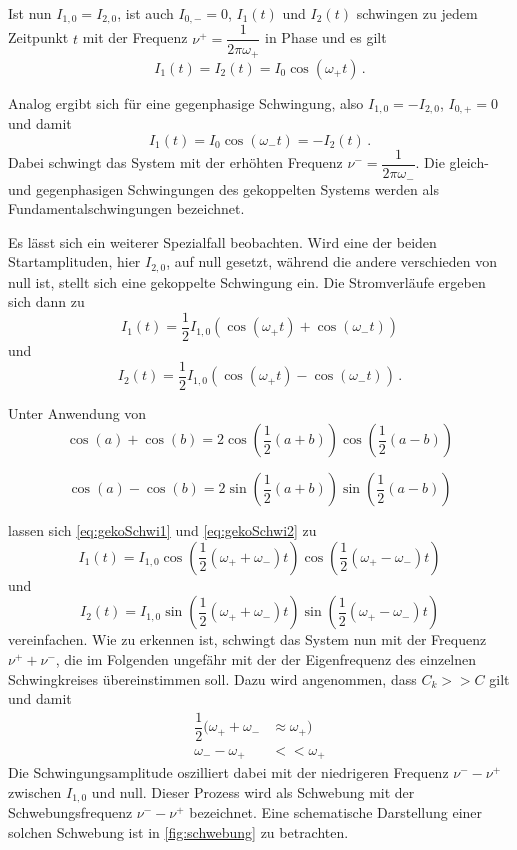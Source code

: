 Ist nun $I_{1,0} = I_{2,0}$, ist auch $I_{0,-} = 0$, $I_1(t)$ und $I_2(t)$ schwingen zu jedem Zeitpunkt $t$ mit der Frequenz $ν^+ = \dfrac{1}{2πω_+}$ in Phase und es gilt
\begin{equation*}
     I_1(t) = I_2(t) = I_0 \cos(ω_+ t)\,.
\end{equation*}

Analog ergibt sich für eine gegenphasige Schwingung, also $I_{1,0} = -I_{2,0}$, $I_{0,+}=0$ und damit
\begin{equation*}
    I_1(t) = I_0 \cos(ω_- t) = -I_2(t)\,.
\end{equation*}
Dabei schwingt das System mit der erhöhten Frequenz $ν^- = \dfrac{1}{2πω_-}$. Die gleich- und gegenphasigen Schwingungen des gekoppelten Systems werden als Fundamentalschwingungen bezeichnet.

Es lässt sich ein weiterer Spezialfall beobachten. Wird eine der beiden Startamplituden, hier $I_{2,0}$, auf null gesetzt, während die andere verschieden von null ist, stellt sich eine gekoppelte Schwingung ein.
Die Stromverläufe ergeben sich dann zu
\begin{equation}
    I_1(t) = \dfrac{1}{2} I_{1,0}(\cos(ω_+ t) + \cos(ω_- t))
    \label{eq:gekoSchwi1}
\end{equation}
und
\begin{equation}
    I_2(t) = \dfrac{1}{2} I_{1,0}(\cos(ω_+ t) - \cos(ω_- t))\,.
    \label{eq:gekoSchwi2}
\end{equation}

Unter Anwendung von
\begin{equation*}
    \cos(a) + \cos(b) = 2 \cos(\dfrac{1}{2}(a+b)) \cos(\dfrac{1}{2}(a-b))
\end{equation*} 

\begin{equation*}
    \cos(a) - \cos(b) = 2 \sin(\dfrac{1}{2}(a+b)) \sin(\dfrac{1}{2}(a-b))
\end{equation*} 

lassen sich \eqref{eq:gekoSchwi1} und \eqref{eq:gekoSchwi2} zu
\begin{equation*}
    I_1(t) = I_{1,0}\cos(\dfrac{1}{2}(ω_+ + ω_-)t) \cos(\dfrac{1}{2}(ω_+ - ω_-)t) 
\end{equation*}
und
\begin{equation*}
    I_2(t) = I_{1,0}\sin(\dfrac{1}{2}(ω_+ + ω_-)t) \sin(\dfrac{1}{2}(ω_+ - ω_-)t)
\end{equation*}
vereinfachen. Wie zu erkennen ist, schwingt das System nun mit der Frequenz $ν^+ + ν^-$, die im Folgenden ungefähr mit der der Eigenfrequenz des einzelnen Schwingkreises übereinstimmen soll.
Dazu wird angenommen, dass $C_k >> C$ gilt und damit
\begin{align*}
    \dfrac{1}{2}(ω_+ + ω_- & \approx ω_+) \\
    ω_- - ω_+ & << ω_+
\end{align*}
Die Schwingungsamplitude oszilliert dabei mit der niedrigeren Frequenz $ν^- - ν^+$ zwischen $I_{1,0}$ und null. Dieser Prozess wird als Schwebung mit der Schwebungsfrequenz $ν^- - ν^+$ bezeichnet.
Eine schematische Darstellung einer solchen Schwebung ist in \autoref{fig:schwebung} zu betrachten.

